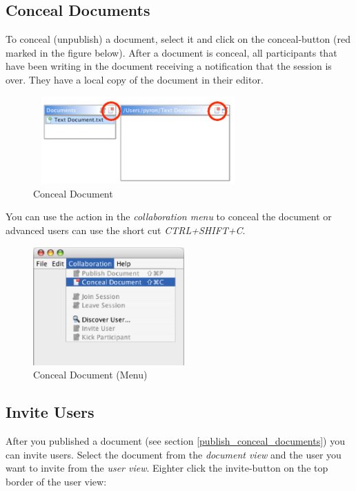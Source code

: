 \documentclass[11pt,a4paper]{article}
\begin{document}
\subsection{Conceal Documents}
To conceal (unpublish) a document, select it and click on the conceal-button (red marked in the figure below). After a document is conceal, all participants that have been writing in the document receiving a notification that the session is over. They have a local copy of the document in their editor.

\begin{figure}[H]
\begin{center}
  \includegraphics[height=1.32in, width=3.16in]{../images/usermanual/g_editor_view_conceal.eps}
\caption{Conceal Document}
\label{editor_view_conceal}
\end{center}
\end{figure}

You can use the action in the \textit{collaboration menu} to conceal the document or advanced users can use the short cut \textit{CTRL+SHIFT+C}.

\begin{figure}[H]
\begin{center}
  \includegraphics[height=1.78in, width=2.28in]{../images/usermanual/menu_collab_conceal.eps}
\caption{Conceal Document (Menu)}
\label{menu_conceal}
\end{center}
\end{figure}

\subsection{Invite Users}
\label{invite_kick_users}
After you published a document (see section \ref{publish_conceal_documents}) you can invite users. Select the document from the \textit{document view} and the user you want to invite from the \textit{user view}. Eighter click the invite-button on the top border of the user view:
\end{document}
